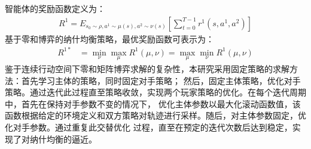 智能体的奖励函数定义为：
\begin{align}
    R^{1}=E_{s_{0} \sim \rho, a^{1} \sim \mu(s), a^{2} \sim \nu(s)}\left[\sum_{t=0}^{T-1} r^{1}\left(s, a^{1}, a^{2}\right)\right]
\end{align}
基于零和博弈的纳什均衡策略，最优奖励函数可表示为：
\begin{align}
    R^{1 *} & = \min _{\nu} \max _{\mu} R^{1}(\mu, \nu) = \max _{\mu} \min _{\nu} R^{1}(\mu, \nu)
\end{align}
鉴于连续行动空间下零和矩阵博弈求解的复杂性，本研究采用固定策略的求解方法：首先学习主体的策略，同时固定对手策略；
然后，固定主体策略，优化对手策略。通过迭代此过程直至策略收敛，实现两个玩家策略的优化。在每个迭代周期中，首先在保持对手参数不变的情况下，
优化主体参数以最大化滚动函数值，该函数根据给定的环境定义和双方策略对轨迹进行采样。随后，对主体参数固定，优化对手参数。通过重复此交替优化
过程，直至在预定的迭代次数后达到稳定，实现了对纳什均衡的逼近。

